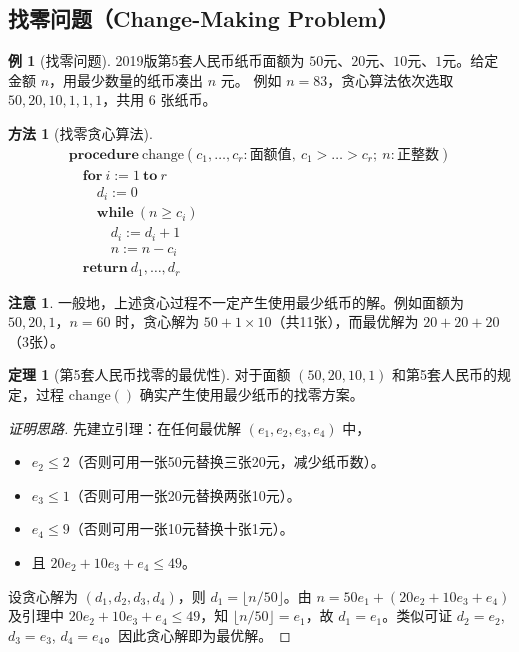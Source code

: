 \documentclass[UTF8,11pt,a4paper]{ctexbook}   %
\theoremstyle{definition}
\newtheorem{theorem}{定理}[section]
\newtheorem{example}{例}[section]
\newtheorem{warning}{注意}[section]
\newtheorem{method}{方法}[section]
\begin{document}
\subsection{找零问题（Change-Making Problem）}

\begin{example}[找零问题]
2019版第5套人民币纸币面额为 $50$元、$20$元、$10$元、$1$元。给定金额 $n$，用最少数量的纸币凑出 $n$ 元。
例如 $n=83$，贪心算法依次选取 $50,20,10,1,1,1$，共用 $6$ 张纸币。
\end{example}

\begin{method}[找零贪心算法]
\[
\begin{array}{l}
\textbf{procedure}\ \text{change}(c_1, \ldots, c_r: \text{面额值},\ c_1 > \dots > c_r;\ n: \text{正整数})\\
\quad \textbf{for}\ i := 1\ \textbf{to}\ r\\
\quad \quad d_i := 0\\
\quad \quad \textbf{while}\ (n \geq c_i)\\
\quad \quad \quad d_i := d_i + 1\\
\quad \quad \quad n := n - c_i\\
\quad \textbf{return}\ d_1, \ldots, d_r
\end{array}
\]
\end{method}

\begin{warning}
一般地，上述贪心过程不一定产生使用最少纸币的解。例如面额为 $50, 20, 1$，$n=60$ 时，贪心解为 $50+1\times10$（共11张），而最优解为 $20+20+20$（3张）。
\end{warning}

\begin{theorem}[第5套人民币找零的最优性]
对于面额 $(50,20,10,1)$ 和第5套人民币的规定，过程 $\text{change}()$ 确实产生使用最少纸币的找零方案。
\end{theorem}

\begin{proof}[证明思路]
先建立引理：在任何最优解 $(e_1,e_2,e_3,e_4)$ 中，
\begin{itemize}
    \item $e_2 \leq 2$（否则可用一张50元替换三张20元，减少纸币数）。
    \item $e_3 \leq 1$（否则可用一张20元替换两张10元）。
    \item $e_4 \leq 9$（否则可用一张10元替换十张1元）。
    \item 且 $20e_2 + 10e_3 + e_4 \leq 49$。
\end{itemize}
设贪心解为 $(d_1,d_2,d_3,d_4)$，则 $d_1 = \lfloor n/50\rfloor$。由 $n=50e_1+(20e_2+10e_3+e_4)$ 及引理中 $20e_2+10e_3+e_4 \leq 49$，知 $\lfloor n/50\rfloor = e_1$，故 $d_1=e_1$。类似可证 $d_2=e_2$, $d_3=e_3$, $d_4=e_4$。因此贪心解即为最优解。
\end{proof}
\end{document}
